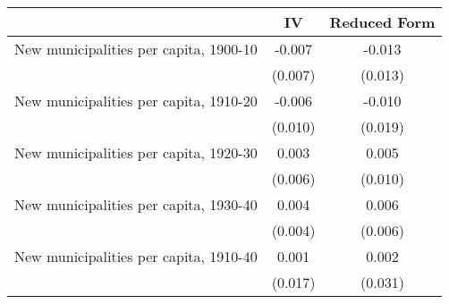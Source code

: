  \begin{tabular}{l*{2}{c}} \toprule
                &\multicolumn{1}{c}{IV}&\multicolumn{1}{c}{Reduced Form}\\
\midrule
New municipalities per capita, 1900-10&   -0.007   &   -0.013   \\
                &  (0.007)   &  (0.013)   \\
\addlinespace
New municipalities per capita, 1910-20&   -0.006   &   -0.010   \\
                &  (0.010)   &  (0.019)   \\
\addlinespace
New municipalities per capita, 1920-30&    0.003   &    0.005   \\
                &  (0.006)   &  (0.010)   \\
\addlinespace
New municipalities per capita, 1930-40&    0.004   &    0.006   \\
                &  (0.004)   &  (0.006)   \\
\addlinespace
New municipalities per capita, 1910-40&    0.001   &    0.002   \\
                &  (0.017)   &  (0.031)   \\
 \bottomrule \end{tabular}
